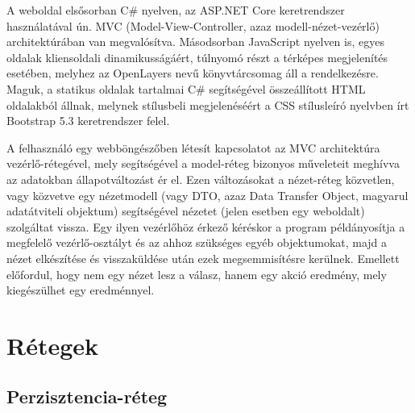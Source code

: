 A weboldal elsősorban C\# nyelven, az ASP.NET Core keretrendszer használatával ún. MVC (Model-View-Controller, azaz modell-nézet-vezérlő) architektúrában van megvalósítva. \cite{aspnet-overview} Másodsorban JavaScript nyelven is, egyes oldalak kliensoldali dinamikusságáért, túlnyomó részt a térképes megjelenítés esetében, melyhez az OpenLayers nevű könyvtárcsomag áll a rendelkezésre. \cite{javascript-overview} \cite{openlayers-concepts} Maguk, a statikus oldalak tartalmai C\# segítségével összeállított HTML oldalakból állnak, melynek stílusbeli megjelenéséért a CSS stílusleíró nyelvben írt Bootstrap 5.3 keretrendszer felel. \cite{bootstrap-introduction} \par
A felhasználó egy webböngészőben létesít kapcsolatot az MVC architektúra vezérlő-rétegével, mely segítségével a model-réteg bizonyos műveleteit meghívva az adatokban állapotváltozást ér el. Ezen változásokat a nézet-réteg közvetlen, vagy közvetve egy nézetmodell (vagy DTO, azaz Data Transfer Object, magyarul adatátviteli objektum) segítségével nézetet (jelen esetben egy weboldalt) szolgáltat vissza. Egy ilyen vezérlőhöz érkező kéréskor a program példányosítja a megfelelő vezérlő-osztályt és az ahhoz szükséges egyéb objektumokat, majd a nézet elkészítése és visszaküldése után ezek megsemmisítésre kerülnek. Emellett előfordul, hogy nem egy nézet lesz a válasz, hanem egy akció eredmény, mely kiegészülhet egy eredménnyel. \cite{mvc-behavior}

\section{Rétegek}

\subsection{Perzisztencia-réteg}
\label{subsec:persistence}

